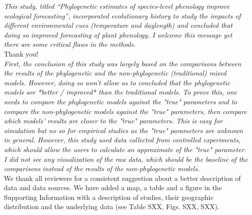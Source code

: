 \documentclass[11pt]{article}
\begin{document}
\emph{This study, titled “Phylogenetic estimates of species-level phenology improve ecological forecasting”, incorporated evolutionary history to study the impacts of different environmental cues (temperature and daylength) and concluded that doing so improved forecasting of plant phenology. I welcome this message yet there are some critical flaws in the methods.}\\

Thank you!\\

\emph{First, the conclusion of this study was largely based on the comparisons between the results of the phylogenetic and the non-phylogenetic (traditional) mixed models. However, doing so won't allow us to concluded that the phylogenetic models are *better / improved* than the traditional models. To prove this, one needs to compare the phylogenetic models against the "true" parameters and to compare the non-phylogenetic models against the "true" parameters, then compare which models' results are closer to the "true" parameters. This is easy for simulation but no so for empirical studies as the "true" parameters are unknown in general. However, this study used data collected from controlled experiments, which should allow the users to calculate an approximate of the "true" parameter. I did not see any visualization of the raw data, which should be the baseline of the comparisons instead of the results of the non-phylogenetic models.}\\
We thank all reviewers for a consistent suggestion about a better description of data and data sources. We have added a map, a table and a figure in the Supporting Information with a description of studies, their geographic distribution and the underlying data (see Table SXX, Figs. SXX, SXX).
\end{document}

